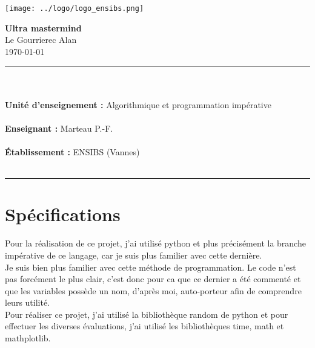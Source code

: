 \documentclass[french,12pt,a4paper]{report}
\begin{document}
\begin{titlepage}

\begin{center}
\texttt{[image: ../logo/logo\_ensibs.png]} 
\end{center}
\vspace{3 cm}

\begin{center}
\Huge{\textbf{Ultra mastermind}} \\
\large
Le Gourrierec Alan \\
\today

\end{center}
\vspace{4 cm}
\rule{1\linewidth}{1pt} \\ \\
\large{
\textbf{Unité d'enseignement : }  Algorithmique et programmation impérative \\ \\
\textbf{Enseignant : }Marteau P.-F.   \\ \\
\textbf{Établissement :} ENSIBS (Vannes) \\ \\
}
\rule{1\linewidth}{1pt}
\end{titlepage}

\normalsize

\tableofcontents

\newpage

\chapter{Spécifications}

Pour la réalisation de ce projet, j'ai utilisé python et plus précisément la branche impérative de ce langage, car je suis plus familier avec cette dernière.\\


Je suis bien plus familier avec cette méthode de programmation. Le code n'est pas forcément le plus clair, c'est donc pour ca que ce dernier a été commenté et que les variables possède un nom, d'après moi, auto-porteur afin de comprendre leurs utilité. \\


Pour réaliser ce projet, j'ai utilisé la bibliothèque random de python et pour effectuer les diverses évaluations, j'ai utilisé les bibliothèques time, math et mathplotlib.
\end{document}
